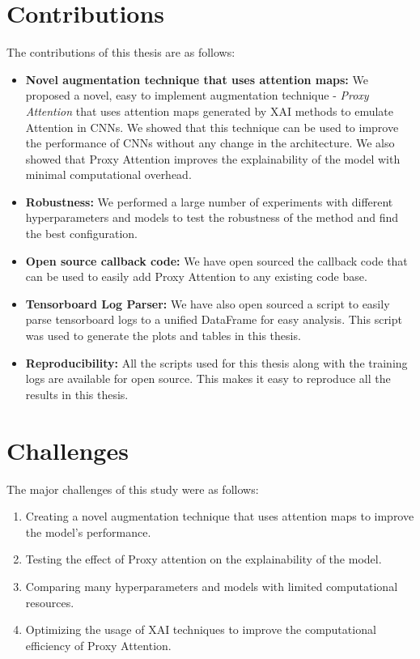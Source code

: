 \documentclass[a4paper,11pt,openright]{book}
\begin{document}
\section{Contributions}
The contributions of this thesis are as follows:
\begin{itemize}
    \item \textbf{Novel augmentation technique that uses attention maps: } We proposed a novel, easy to implement augmentation technique - \textit{Proxy Attention} that uses attention maps generated by XAI methods to emulate Attention in CNNs. We showed that this technique can be used to improve the performance of CNNs without any change in the architecture. We also showed that Proxy Attention improves the explainability of the model with minimal computational overhead.
    \item \textbf{Robustness: } We performed a large number of experiments with different hyperparameters and models to test the robustness of the method and find the best configuration. 
    \item \textbf{Open source callback code: } We have open sourced the callback code that can be used to easily add Proxy Attention to any existing code base.
    \item \textbf{Tensorboard Log Parser: } We have also open sourced a script to easily parse tensorboard logs to a unified DataFrame for easy analysis. This script was used to generate the plots and tables in this thesis.
    \item \textbf{Reproducibility: } All the scripts used for this thesis along with the training logs are available for open source. This makes it easy to reproduce all the results in this thesis.
\end{itemize}


\section{Challenges}
The major challenges of this study were as follows:
\begin{enumerate}
    \item Creating a novel augmentation technique that uses attention maps to improve the model's performance.
    \item Testing the effect of Proxy attention on the explainability of the model.
    \item Comparing many hyperparameters and models with limited computational resources.
    \item Optimizing the usage of XAI techniques to improve the computational efficiency of Proxy Attention.
\end{enumerate}
\end{document}
